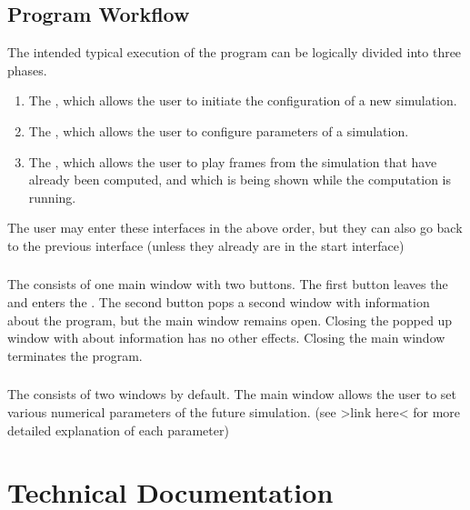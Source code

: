 \documentclass{article}
\begin{document}
\subsection{Program Workflow}
The intended typical execution of the program can be logically divided into three phases.
\begin{enumerate}
	\item The \hyperref[sec:i0]{\inull}, which allows the user to initiate the configuration of a new simulation.
	\item The \hyperref[sec:i1]{\ione}, which allows the user to configure parameters of a simulation.
	\item The \hyperref[sec:i2]{\itwo}, which allows the user to play frames from the simulation that have already been computed, and which is being shown while the computation is running.
\end{enumerate}
The user may enter these interfaces in the above order, but they can also go back to the previous interface (unless they already are in the start interface)

\subsubsection{\Inull}\label{sec:i0}
The \inull{} consists of one main window with two buttons. The first button leaves the \inull{} and enters the \ione. The second button pops a second window with information about the program, but the main window remains open. Closing the popped up window with about information has no other effects. Closing the main window terminates the program.


\subsubsection{\Ione}\label{sec:i1}

The \ione{} consists of two windows by default. The main window allows the user to set various numerical parameters of the future simulation. (see >link here< for more detailed explanation of each parameter)

\subsubsection{\Itwo}\label{sec:i2}

\section{Technical Documentation}
\end{document}
